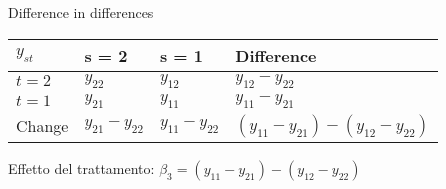\documentclass[
  ignorenonframetext,
]{beamer}
\begin{document}
\begin{frame}{Difference in differences}
\protect\hypertarget{difference-in-differences-1}{}

\begin{longtable}[]{@{}llll@{}}
\toprule
\begin{minipage}[b]{0.16\columnwidth}\raggedright
\(y_{st}\)\strut
\end{minipage} & \begin{minipage}[b]{0.19\columnwidth}\raggedright
s = 2\strut
\end{minipage} & \begin{minipage}[b]{0.19\columnwidth}\raggedright
s = 1\strut
\end{minipage} & \begin{minipage}[b]{0.35\columnwidth}\raggedright
Difference\strut
\end{minipage}\tabularnewline
\midrule
\endhead
\begin{minipage}[t]{0.16\columnwidth}\raggedright
\(t = 2\)\strut
\end{minipage} & \begin{minipage}[t]{0.19\columnwidth}\raggedright
\(y_{22}\)\strut
\end{minipage} & \begin{minipage}[t]{0.19\columnwidth}\raggedright
\(y_{12}\)\strut
\end{minipage} & \begin{minipage}[t]{0.35\columnwidth}\raggedright
\(y_{12} - y_{22}\)\strut
\end{minipage}\tabularnewline
\begin{minipage}[t]{0.16\columnwidth}\raggedright
\(t = 1\)\strut
\end{minipage} & \begin{minipage}[t]{0.19\columnwidth}\raggedright
\(y_{21}\)\strut
\end{minipage} & \begin{minipage}[t]{0.19\columnwidth}\raggedright
\(y_{11}\)\strut
\end{minipage} & \begin{minipage}[t]{0.35\columnwidth}\raggedright
\(y_{11} - y_{21}\)\strut
\end{minipage}\tabularnewline
\begin{minipage}[t]{0.16\columnwidth}\raggedright
Change\strut
\end{minipage} & \begin{minipage}[t]{0.19\columnwidth}\raggedright
\(y_{21} - y_{22}\)\strut
\end{minipage} & \begin{minipage}[t]{0.19\columnwidth}\raggedright
\(y_{11} - y_{22}\)\strut
\end{minipage} & \begin{minipage}[t]{0.35\columnwidth}\raggedright
\((y_{11} - y_{21}) - (y_{12} - y_{22})\)\strut
\end{minipage}\tabularnewline
\bottomrule
\end{longtable}

Effetto del trattamento:
\(\beta_3 = (y_{11} - y_{21}) - (y_{12} - y_{22})\)

\end{frame}
\end{document}
